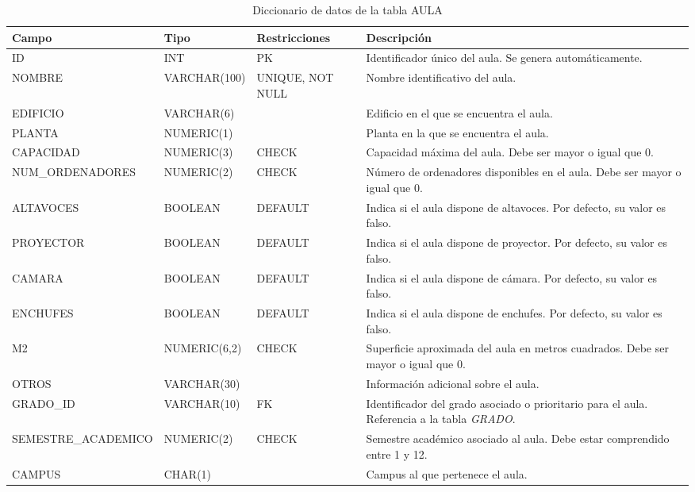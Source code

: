 \begin{table}[H]
	\centering
	\scriptsize
	\setlength{\tabcolsep}{3pt}
	\renewcommand{\arraystretch}{1.15}
	\begin{tabularx}{\textwidth}{@{}
			>{\raggedright\arraybackslash}p{2.6cm}
			>{\raggedright\arraybackslash}p{2.2cm}
			>{\raggedright\arraybackslash}p{2.2cm}
			X@{}}
		\toprule
		\textbf{Campo} & \textbf{Tipo} & \textbf{Restricciones} & \textbf{Descripción} \\
		\midrule
		ID & INT & PK & Identificador único del aula. Se genera automáticamente. \\
		NOMBRE & VARCHAR(100) & UNIQUE, NOT NULL & Nombre identificativo del aula. \\
		EDIFICIO & VARCHAR(6) &  & Edificio en el que se encuentra el aula. \\
		PLANTA & NUMERIC(1) &  & Planta en la que se encuentra el aula. \\
		CAPACIDAD & NUMERIC(3) & CHECK & Capacidad máxima del aula. Debe ser mayor o igual que 0. \\
		NUM\_\newline ORDENADORES & NUMERIC(2) & CHECK & Número de ordenadores disponibles en el aula. Debe ser mayor o igual que 0. \\
		ALTAVOCES & BOOLEAN & DEFAULT & Indica si el aula dispone de altavoces. Por defecto, su valor es falso. \\
		PROYECTOR & BOOLEAN & DEFAULT & Indica si el aula dispone de proyector. Por defecto, su valor es falso. \\
		CAMARA & BOOLEAN & DEFAULT & Indica si el aula dispone de cámara. Por defecto, su valor es falso. \\
		ENCHUFES & BOOLEAN & DEFAULT & Indica si el aula dispone de enchufes. Por defecto, su valor es falso. \\
		M2 & NUMERIC(6,2) & CHECK & Superficie aproximada del aula en metros cuadrados. Debe ser mayor o igual que 0. \\
		OTROS & VARCHAR(30) &  & Información adicional sobre el aula. \\
		GRADO\_ID & VARCHAR(10) & FK & Identificador del grado asociado o prioritario para el aula. Referencia a la tabla \textit{GRADO}. \\
		SEMESTRE\_\newline ACADEMICO & NUMERIC(2) & CHECK & Semestre académico asociado al aula. Debe estar comprendido entre 1 y 12. \\
		CAMPUS & CHAR(1) &  & Campus al que pertenece el aula. \\
		\bottomrule
	\end{tabularx}
	\caption{Diccionario de datos de la tabla AULA}
	\label{tab:diccionario-aula}
\end{table}



